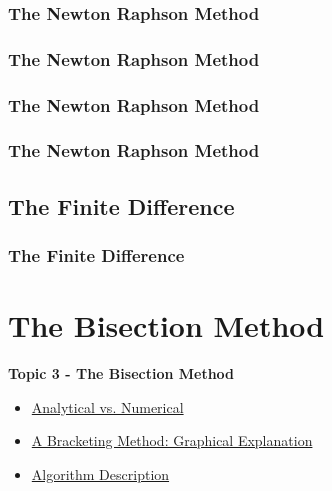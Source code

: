 \documentclass[fleqn]{beamer} %
\newcommand{\sectionIIItitle}{The Bisection Method}
\newcommand{\sectionIIsubsectionIIItitle}{The Newton Raphson Method}
\newcommand{\sectionIIsubsectionIVtitle}{The Finite Difference}
\newcommand{\sectionIIIsubsectionItitle}{Analytical vs. Numerical}
\newcommand{\sectionIIIsubsectionIItitle}{A Bracketing Method: Graphical Explanation}
\newcommand{\sectionIIIsubsectionIIItitle}{Algorithm Description}
\newcommand{\sectionIIIsubsectionIVtitle}{Programming Exercise}
\begin{document}
			\begin{frame}
				\frametitle{\sectionIIsubsectionIIItitle}
				\bigskip

				\btVFill 
			\end{frame}

			\begin{frame}
				\frametitle{\sectionIIsubsectionIIItitle}
				\bigskip

				\btVFill 
			\end{frame}

			\begin{frame}
				\frametitle{\sectionIIsubsectionIIItitle}
				\bigskip
			
				\btVFill 
			\end{frame}

			\begin{frame}
				\frametitle{\sectionIIsubsectionIIItitle}
				\bigskip

				\btVFill 
			\end{frame}

		\subsection{\sectionIIsubsectionIVtitle}\label{sectionIIsubsectionIV}

			\begin{frame}
				\frametitle{\sectionIIsubsectionIVtitle}
				\bigskip

				\btVFill 
			\end{frame}
		
	\section{\sectionIIItitle}\label{sectionIII}

		\begin{frame}
			\large \textbf{Topic 3 - \sectionIIItitle} \vspace{3mm}\\

			\begin{itemize}
				\item \hyperlink{sectionIIIsubsectionI}{\sectionIIIsubsectionItitle} \vspc %
				\item \hyperlink{sectionIIIsubsectionII}{\sectionIIIsubsectionIItitle} \vspc %
				\item \hyperlink{sectionIIIsubsectionIII}{\sectionIIIsubsectionIIItitle} \vspc %
			\end{itemize}

		\end{frame}
\end{document}
